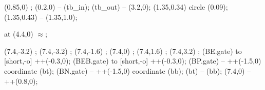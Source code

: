 \begin{circuitikz}
\begin{scope}[shift={(0,8.5)}]
  \end{scope}

  \begin{scope}[shift={(2.0,0)}]

    \draw (0.85,0) ;
    \draw (0.2,0) -- (tb_in);
    \draw (tb_out) -- (3.2,0);
    \draw (1.35,0.34) circle (0.09);
    \draw (1.35,0.43) -- (1.35,1.0);

    \node[armygreen, scale=1.4] at (4.4,0) {$\approx$};

    \draw (7.4,-3.2) \vground;
    \draw (7.4,-3.2) ;
    \draw (7.4,-1.6) ;
    \draw (7.4,0) ;
    \draw (7.4,1.6) ;
    \draw (7.4,3.2) \vsupply;
    \draw (BE.gate) to [short,-o] ++(-0.3,0);
    \draw (BEB.gate) to [short,-o] ++(-0.3,0);
    \draw (BP.gate) -- ++(-1.5,0) coordinate (bt);
    \draw (BN.gate) -- ++(-1.5,0) coordinate (bb);
    \draw (bt) -- (bb);
    \draw (7.4,0) -- ++(0.8,0);

  \end{scope}

\end{circuitikz}

